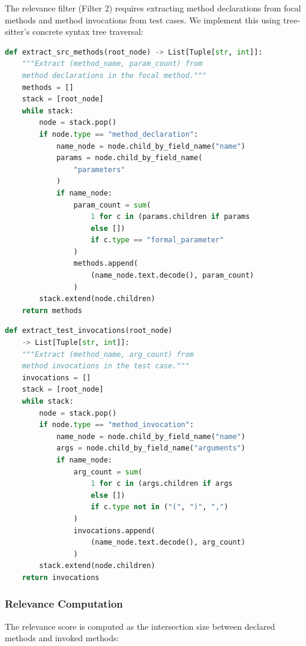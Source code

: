 \documentclass[acmlarge,nonacm,screen]{acmart}
\begin{document}
The relevance filter (Filter 2) requires extracting method declarations from focal methods and method invocations from test cases. We implement this using tree-sitter's concrete syntax tree traversal:

\begin{lstlisting}[language=Python,caption={Extracting method declarations from focal method AST}]
def extract_src_methods(root_node) -> List[Tuple[str, int]]:
    """Extract (method_name, param_count) from
    method declarations in the focal method."""
    methods = []
    stack = [root_node]
    while stack:
        node = stack.pop()
        if node.type == "method_declaration":
            name_node = node.child_by_field_name("name")
            params = node.child_by_field_name(
                "parameters"
            )
            if name_node:
                param_count = sum(
                    1 for c in (params.children if params
                    else [])
                    if c.type == "formal_parameter"
                )
                methods.append(
                    (name_node.text.decode(), param_count)
                )
        stack.extend(node.children)
    return methods
\end{lstlisting}

\begin{lstlisting}[language=Python,caption={Extracting method invocations from test case AST}]
def extract_test_invocations(root_node)
    -> List[Tuple[str, int]]:
    """Extract (method_name, arg_count) from
    method invocations in the test case."""
    invocations = []
    stack = [root_node]
    while stack:
        node = stack.pop()
        if node.type == "method_invocation":
            name_node = node.child_by_field_name("name")
            args = node.child_by_field_name("arguments")
            if name_node:
                arg_count = sum(
                    1 for c in (args.children if args
                    else [])
                    if c.type not in ("(", ")", ",")
                )
                invocations.append(
                    (name_node.text.decode(), arg_count)
                )
        stack.extend(node.children)
    return invocations
\end{lstlisting}

\subsubsection{Relevance Computation}

The relevance score is computed as the intersection size between declared methods and invoked methods:
\end{document}
